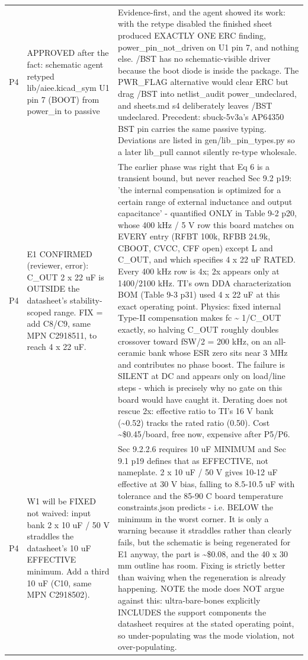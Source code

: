 \documentclass[11pt,a4paper]{article}
\begin{document}
{\begin{longtable}{lp{5.2cm}p{7.2cm}}
P4 & APPROVED after the fact: schematic agent retyped lib/aiee.kicad\_sym U1 pin 7 (BOOT) from power\_in to passive & Evidence-first, and the agent showed its work: with the retype disabled the finished sheet produced EXACTLY ONE ERC finding, power\_pin\_not\_driven on U1 pin 7, and nothing else. /BST has no schematic-visible driver because the boot diode is inside the package. The PWR\_FLAG alternative would clear ERC but drag /BST into netlist\_audit power\_undeclared, and sheets.md s4 deliberately leaves /BST undeclared. Precedent: sbuck-5v3a's AP64350 BST pin carries the same passive typing. Deviations are listed in gen/lib\_pin\_types.py so a later lib\_pull cannot silently re-type wholesale. \\
P4 & E1 CONFIRMED (reviewer, error): C\_OUT 2 x 22 uF is OUTSIDE the datasheet's stability-scoped range. FIX = add C8/C9, same MPN C2918511, to reach 4 x 22 uF. & The earlier phase was right that Eq 6 is a transient bound, but never reached Sec 9.2 p19: 'the internal compensation is optimized for a certain range of external inductance and output capacitance' - quantified ONLY in Table 9-2 p20, whose 400 kHz / 5 V row this board matches on EVERY entry (RFBT 100k, RFBB 24.9k, CBOOT, CVCC, CFF open) except L and C\_OUT, and which specifies 4 x 22 uF RATED. Every 400 kHz row is 4x; 2x appears only at 1400/2100 kHz. TI's own DDA characterization BOM (Table 9-3 p31) used 4 x 22 uF at this exact operating point. Physics: fixed internal Type-II compensation makes fc \textasciitilde{} 1/C\_OUT exactly, so halving C\_OUT roughly doubles crossover toward fSW/2 = 200 kHz, on an all-ceramic bank whose ESR zero sits near 3 MHz and contributes no phase boost. The failure is SILENT at DC and appears only on load/line steps - which is precisely why no gate on this board would have caught it. Derating does not rescue 2x: effective ratio to TI's 16 V bank (\textasciitilde{}0.52) tracks the rated ratio (0.50). Cost \textasciitilde{}\$0.45/board, free now, expensive after P5/P6. \\
P4 & W1 will be FIXED not waived: input bank 2 x 10 uF / 50 V straddles the datasheet's 10 uF EFFECTIVE minimum. Add a third 10 uF (C10, same MPN C2918502). & Sec 9.2.2.6 requires 10 uF MINIMUM and Sec 9.1 p19 defines that as EFFECTIVE, not nameplate. 2 x 10 uF / 50 V gives 10-12 uF effective at 30 V bias, falling to 8.5-10.5 uF with tolerance and the 85-90 C board temperature constraints.json predicts - i.e. BELOW the minimum in the worst corner. It is only a warning because it straddles rather than clearly fails, but the schematic is being regenerated for E1 anyway, the part is \textasciitilde{}\$0.08, and the 40 x 30 mm outline has room. Fixing is strictly better than waiving when the regeneration is already happening. NOTE the mode does NOT argue against this: ultra-bare-bones explicitly INCLUDES the support components the datasheet requires at the stated operating point, so under-populating was the mode violation, not over-populating. \\

\end{longtable}}
\end{document}
